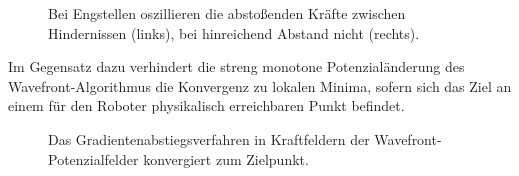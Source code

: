 \begin{figure}[H]
\begin{minipage}{0.46\textwidth}
		\centerline{}
	\end{minipage}
	\hspace*{\fill}
	\label{fig:oscillation}
	\caption{Bei Engstellen oszillieren die abstoßenden Kräfte zwischen Hindernissen (links), bei hinreichend Abstand nicht (rechts).}
\end{figure}

Im Gegensatz dazu verhindert die streng monotone Potenzialänderung des Wavefront-Algorithmus die Konvergenz zu lokalen Minima, sofern sich das Ziel an einem für den Roboter physikalisch erreichbaren Punkt befindet.
\vspace*{0.1cm}
\begin{figure}[H]
	\footnotesize
	\centering
	\centerline{}
	\caption{Das Gradientenabstiegsverfahren in Kraftfeldern der Wavefront-Potenzialfelder konvergiert zum Zielpunkt.}
\end{figure}


